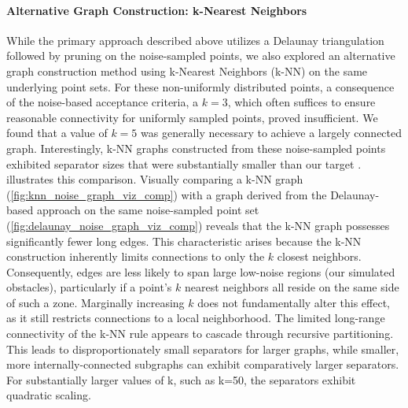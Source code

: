 \paragraph{Alternative Graph Construction: k-Nearest Neighbors}

While the primary approach described above utilizes a Delaunay triangulation followed by pruning on the noise-sampled points, we also explored an alternative graph construction method using k-Nearest Neighbors (k-NN) on the same underlying point sets.
For these non-uniformly distributed points, a consequence of the noise-based acceptance criteria, a \(k=3\), which often suffices to ensure reasonable connectivity for uniformly sampled points, proved insufficient.
We found that a value of \(k=5\) was generally necessary to achieve a largely connected graph.
Interestingly, k-NN graphs constructed from these noise-sampled points exhibited separator sizes that were substantially smaller than our target .
 illustrates this comparison.
Visually comparing a k-NN graph (\cref{fig:knn_noise_graph_viz_comp}) with a graph derived from the Delaunay-based approach on the same noise-sampled point set (\cref{fig:delaunay_noise_graph_viz_comp}) reveals that the k-NN graph possesses significantly fewer long edges.
This characteristic arises because the k-NN construction inherently limits connections to only the \(k\) closest neighbors.
Consequently, edges are less likely to span large low-noise regions (our simulated obstacles), particularly if a point's \(k\) nearest neighbors all reside on the same side of such a zone.
Marginally increasing \(k\) does not fundamentally alter this effect, as it still restricts connections to a local neighborhood.
The limited long-range connectivity of the k-NN rule appears to cascade through recursive partitioning.
This leads to disproportionately small separators for larger graphs, while smaller, more internally-connected subgraphs can exhibit comparatively larger separators.
For substantially larger values of k, such as k=50, the separators exhibit quadratic scaling.

